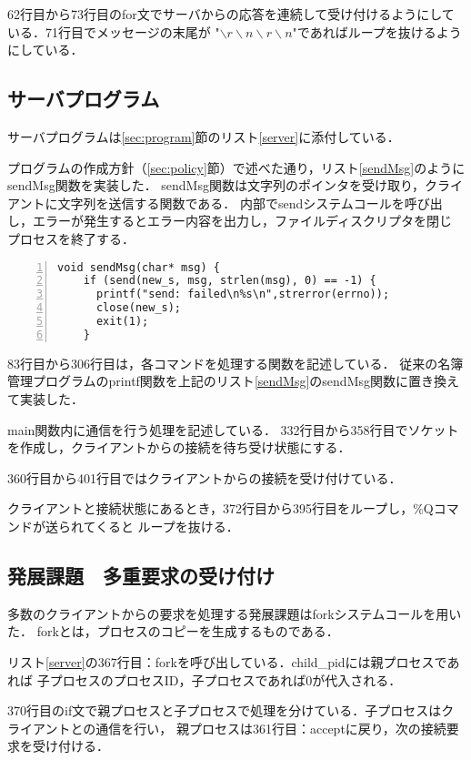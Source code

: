 \documentclass[11pt]{jarticle}
\begin{document}
62行目から73行目のfor文でサーバからの応答を連続して受け付けるようにしている．71行目でメッセージの末尾が
"$\backslash r\backslash n\backslash r\backslash n$"であればループを抜けるようにしている．

\subsection{サーバプログラム}

サーバプログラムは\ref{sec:program}節のリスト\ref{server}に添付している．

プログラムの作成方針（\ref{sec:policy}節）で述べた通り，リスト\ref{sendMsg}のようにsendMsg関数を実装した．
sendMsg関数は文字列のポインタを受け取り，クライアントに文字列を送信する関数である．
内部でsendシステムコールを呼び出し，エラーが発生するとエラー内容を出力し，ファイルディスクリプタを閉じ
プロセスを終了する．

\begin{lstlisting}[caption=sendMsg関数,label=sendMsg,numbers=left]
    void sendMsg(char* msg) {
    if (send(new_s, msg, strlen(msg), 0) == -1) {
      printf("send: failed\n%s\n",strerror(errno));
      close(new_s);
      exit(1);
    }
\end{lstlisting}

83行目から306行目は，各コマンドを処理する関数を記述している．
従来の名簿管理プログラムのprintf関数を上記のリスト\ref{sendMsg}のsendMsg関数に置き換えて実装した．

main関数内に通信を行う処理を記述している．
332行目から358行目でソケットを作成し，クライアントからの接続を待ち受け状態にする．

360行目から401行目ではクライアントからの接続を受け付けている．

クライアントと接続状態にあるとき，372行目から395行目をループし，\%Qコマンドが送られてくると
ループを抜ける．

\subsection{発展課題　多重要求の受け付け}

多数のクライアントからの要求を処理する発展課題はforkシステムコールを用いた．
forkとは，プロセスのコピーを生成するものである．

リスト\ref{server}の367行目：forkを呼び出している．child\_pidには親プロセスであれば
子プロセスのプロセスID，子プロセスであれば0が代入される．

370行目のif文で親プロセスと子プロセスで処理を分けている．子プロセスはクライアントとの通信を行い，
親プロセスは361行目：acceptに戻り，次の接続要求を受け付ける．
\end{document}
